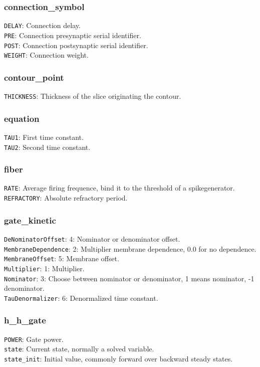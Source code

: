 \documentclass[12pt]{article}
\begin{document}
\subsubsection{connection\_symbol}
{\tt DELAY}: Connection delay.\\
{\tt PRE}: Connection presynaptic serial identifier.\\
{\tt POST}: Connection postsynaptic serial identifier.\\
{\tt WEIGHT}: Connection weight.
\subsubsection{contour\_point}
{\tt THICKNESS}: Thickness of the slice originating the contour.
\subsubsection{equation}
{\tt TAU1}: First time constant.\\
{\tt TAU2}: Second time constant.
\subsubsection{fiber}
{\tt RATE}: Average firing frequence, bind it to the threshold of a spikegenerator.\\
{\tt REFRACTORY}: Absolute refractory period.
\subsubsection{gate\_kinetic}
{\tt DeNominatorOffset}: 4: Nominator or denominator offset.\\
{\tt MembraneDependence}: 2: Multiplier membrane dependence, 0.0 for no dependence.\\
{\tt MembraneOffset}: 5: Membrane offset.\\
{\tt Multiplier}: 1: Multiplier.\\
{\tt Nominator}: 3: Choose between nominator or denominator, 1 means nominator, -1 denominator.\\
{\tt TauDenormalizer}: 6: Denormalized time constant.
\subsubsection{h\_h\_gate}
{\tt POWER}: Gate power.\\
{\tt state}: Current state, normally a solved variable.\\
{\tt state\_init}: Initial value, commonly forward over backward steady states.
\end{document}
